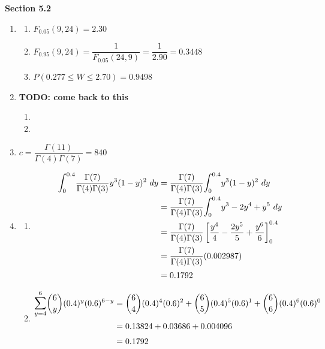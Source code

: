 \documentclass{article}
\newcommand\todo[1]{\textbf{TODO: #1}}%
\newcommand\lint{\mathlarger{\int}}
\newcommand\lsum{\mathlarger{\sum}}
\begin{document}
    \textbf{Section 5.2}
    \begin{enumerate}
     \addtocounter{enumi}{3}
     \item 
      \begin{enumerate}
       \item
	$F_{0.05}(9,24) = 2.30$
       
       \item
	$F_{0.95}(9,24) = \dfrac{1}{F_{0.05}(24,9)} = \dfrac{1}{2.90} = 0.3448$
       
       \item
	$P(0.277 \le W \le 2.70) = 0.9498$
      \end{enumerate}
     \addtocounter{enumi}{3}
     
     \item
      \todo{come back to this}
      \begin{enumerate}
       \item
	
       
       \item
      \end{enumerate}

     
     \item
      $c = \dfrac{\Gamma(11)}{\Gamma(4)\Gamma(7)} = 840$
     \addtocounter{enumi}{1}
     
     \item
      \begin{enumerate}
       \item
	\begin{align*}
	 \lint_0^{0.4} {\dfrac{\Gamma(7)}{\Gamma(4)\Gamma(3)}y^3(1-y)^2\ dy} 
	 &= \dfrac{\Gamma(7)}{\Gamma(4)\Gamma(3)} \lint_0^{0.4}{y^3(1-y)^2\ dy} \\
	 &= \dfrac{\Gamma(7)}{\Gamma(4)\Gamma(3)} \lint_0^{0.4}{y^3 - 2y^4 + y^5\ dy} \\
	 &= \dfrac{\Gamma(7)}{\Gamma(4)\Gamma(3)} \left[\dfrac{y^4}{4} - \dfrac{2y^5}{5} + \dfrac{y^6}{6} \right]_0^{0.4} \\
	 &= \dfrac{\Gamma(7)}{\Gamma(4)\Gamma(3)} (0.002987) \\
	 &= 0.1792
	\end{align*}
       
       \item
	\begin{align*}
	 \lsum_{y=4}^{6} {\dbinom{6}{y}(0.4)^y(0.6)^{6-y}} 
	 &= \dbinom{6}{4}(0.4)^4(0.6)^{2} + \dbinom{6}{5}(0.4)^5(0.6)^{1} + \dbinom{6}{6}(0.4)^6(0.6)^{0} \\ 
	 &= 0.13824 + 0.03686 + 0.004096 \\
	 &= 0.1792
	\end{align*}
      \end{enumerate}
    \end{enumerate}
\end{document}
